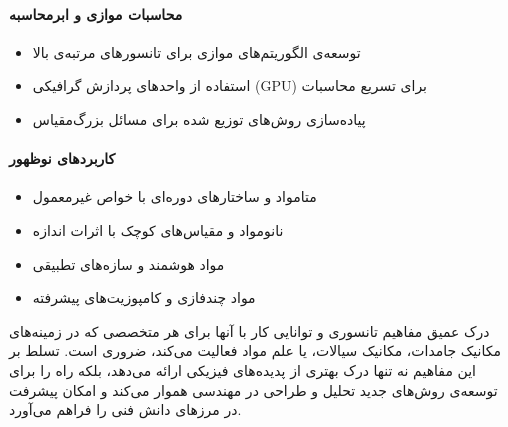 \paragraph{محاسبات موازی و ابرمحاسبه}
\begin{itemize}
    \item توسعه‌ی الگوریتم‌های موازی برای تانسورهای مرتبه‌ی بالا
    \item استفاده از واحدهای پردازش گرافیکی (GPU) برای تسریع محاسبات
    \item پیاده‌سازی روش‌های توزیع شده برای مسائل بزرگ‌مقیاس
\end{itemize}

\paragraph{کاربردهای نوظهور}
\begin{itemize}
    \item متامواد و ساختارهای دوره‌ای با خواص غیرمعمول
    \item نانومواد و مقیاس‌های کوچک با اثرات اندازه
    \item مواد هوشمند و سازه‌های تطبیقی
    \item مواد چندفازی و کامپوزیت‌های پیشرفته
\end{itemize}

درک عمیق مفاهیم تانسوری و توانایی کار با آنها برای هر متخصصی که در زمینه‌های مکانیک جامدات، مکانیک سیالات، یا علم مواد فعالیت می‌کند، ضروری است. تسلط بر این مفاهیم نه تنها درک بهتری از پدیده‌های فیزیکی ارائه می‌دهد، بلکه راه را برای توسعه‌ی روش‌های جدید تحلیل و طراحی در مهندسی هموار می‌کند و امکان پیشرفت در مرزهای دانش فنی را فراهم می‌آورد.
